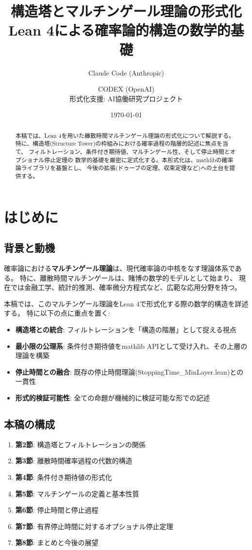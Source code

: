 \documentclass[a4paper,12pt]{ltjsarticle}
\title{構造塔とマルチンゲール理論の形式化\\
{\normalsize Lean 4による確率論的構造の数学的基礎}}
\author{Claude Code (Anthropic) \and CODEX (OpenAI)\\
{\small 形式化支援: AI協働研究プロジェクト}}
\date{\today}
\theoremstyle{definition}
\begin{document}
\maketitle

\begin{abstract}
本稿では、Lean 4を用いた離散時間マルチンゲール理論の形式化について解説する。
特に、構造塔(Structure Tower)の枠組みにおける確率過程の階層的記述に焦点を当て、
フィルトレーション、条件付き期待値、マルチンゲール性、そして停止時間とオプショナル停止定理の
数学的基礎を厳密に定式化する。本形式化は、mathlibの確率論ライブラリを基盤とし、
今後の拡張(ドゥーブの定理、収束定理など)への土台を提供する。
\end{abstract}

\tableofcontents

\section{はじめに}

\subsection{背景と動機}

確率論における\textbf{マルチンゲール理論}は、現代確率論の中核をなす理論体系である。
特に、離散時間マルチンゲールは、賭博の数学的モデルとして始まり、
現在では金融工学、統計的推測、確率微分方程式など、広範な応用分野を持つ。

本稿では、このマルチンゲール理論をLean 4で形式化する際の数学的構造を詳述する。
特に以下の点に重点を置く:

\begin{itemize}
\item \textbf{構造塔との統合}: フィルトレーションを「構造の階層」として捉える視点
\item \textbf{最小限の公理系}: 条件付き期待値をmathlib APIとして受け入れ、その上層の理論を構築
\item \textbf{停止時間との融合}: 既存の停止時間理論(StoppingTime\_MinLayer.lean)との一貫性
\item \textbf{形式的検証可能性}: 全ての命題が機械的に検証可能な形での記述
\end{itemize}

\subsection{本稿の構成}

\begin{enumerate}
\item \textbf{第2節}: 構造塔とフィルトレーションの関係
\item \textbf{第3節}: 離散時間確率過程の代数的構造
\item \textbf{第4節}: 条件付き期待値の形式化
\item \textbf{第5節}: マルチンゲールの定義と基本性質
\item \textbf{第6節}: 停止時間と停止過程
\item \textbf{第7節}: 有界停止時間に対するオプショナル停止定理
\item \textbf{第8節}: まとめと今後の展望
\end{enumerate}
\end{document}
